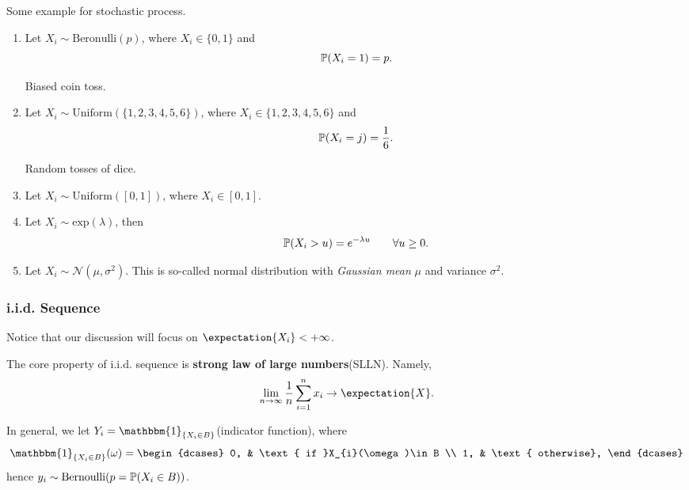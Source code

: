 \begin{eg}
	Some example for stochastic process.
	\begin{enumerate}
		\item Let \(X_i\sim \mathrm{Beronulli}(p)\), where \(X_{i}\in\{0, 1\}\) and
		      \[
			      \mathbb{\MakeUppercase{P}}(X_{i} = 1) = p.
		      \]
		      \begin{intuition}
			      Biased coin toss.
		      \end{intuition}
		\item Let \(X_i\sim \mathrm{Uniform}(\{1, 2, 3, 4, 5, 6\})\), where \(X_{i}\in\{1, 2, 3, 4, 5, 6\}\) and
		      \[
			      \mathbb{\MakeUppercase{P}}(X_{i} = j) = \frac{1}{6}.
		      \]
		      \begin{intuition}
			      Random tosses of dice.
		      \end{intuition}
		\item Let \(X_i\sim \mathrm{Uniform}(\left[ 0, 1 \right] )\), where \(X_{i}\in\left[ 0, 1 \right] \).
		\item Let \(X_i\sim \mathrm{exp}(\lambda)\), then
		      \[
			      \mathbb{\MakeUppercase{P}}(X_{i}>u)=e^{-\lambda u}\qquad \forall u\geq 0.
		      \]
		\item Let \(X_i\sim \mathcal{N}(\mu, \sigma^2)\). This is so-called normal distribution with \emph{Gaussian mean} \(\mu\) and variance \(\sigma^2\).
	\end{enumerate}
\end{eg}

\subsubsection{i.i.d. Sequence}
\begin{remark}
	Notice that our discussion will focus on \(\expectation{X_i} < +\infty \).
\end{remark}

\begin{note}
	The core property of i.i.d. sequence is \textbf{strong law of large numbers}(SLLN). Namely,
	\[
		\lim_{n \to \infty} \frac{1}{n}\sum\limits_{i=1}^{n} x_{i}\to \expectation{X}.
	\]
\end{note}

In general, we let \(Y_{i} = \mathbbm{1}_{\{X_{i}\in B\}}\)(indicator function), where
\[
	\mathbbm{1}_{\{X_{i}\in B\}}(\omega) = \begin{dcases}
		0, & \text{ if }X_{i}(\omega)\in B \\
		1, & \text{ otherwise},
	\end{dcases}
\]
hence \(y_{i}\sim \mathrm{Bernoulli}(p = \mathbb{\MakeUppercase{P}}(X_{i}\in B))\).

